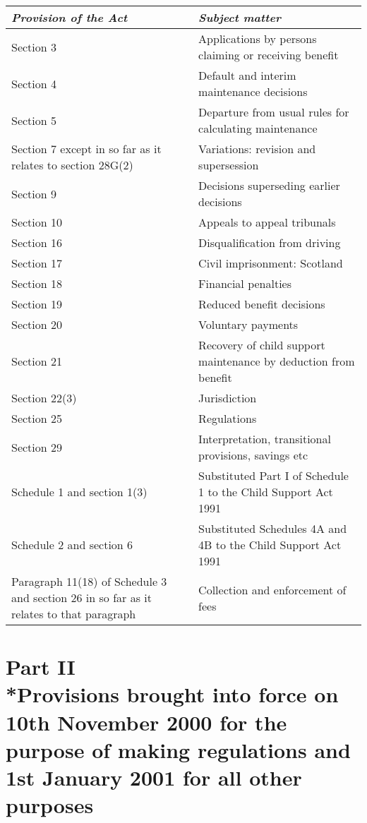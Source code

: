 \documentclass[12pt,a4paper]{article}
\begin{document}
{\footnotesize\noindent
\begin{tabulary}{\linewidth}{JJ}
\hline
\itshape Provision of the Act	& \itshape Subject matter\\
\hline
Section 3	&Applications by persons claiming or receiving benefit\\
Section 4&	Default and interim maintenance decisions\\
Section 5&	Departure from usual rules for calculating maintenance\\
Section 7 except in so far as it relates to section 28G(2)	&Variations: revision and supersession\\
Section 9	&Decisions superseding earlier decisions\\
Section 10	&Appeals to appeal tribunals\\
Section 16	&Disqualification from driving\\
Section 17	&Civil imprisonment: Scotland\\
Section 18	&Financial penalties\\
Section 19	&Reduced benefit decisions\\
Section 20	&Voluntary payments\\
Section 21	&Recovery of child support maintenance by deduction from benefit\\
Section 22(3)	&Jurisdiction\\
Section 25	&Regulations\\
Section 29	&Interpretation, transitional provisions, savings etc\\
Schedule 1 and section 1(3)	&Substituted Part I of Schedule 1 to the Child Support Act 1991\\
Schedule 2 and section 6	&Substituted Schedules 4A and 4B to the Child Support Act 1991\\
Paragraph 11(18) of Schedule 3 and section 26 in so far as it relates to that paragraph	&Collection and enforcement of fees\\
\hline
\end{tabulary}

}

\section[Part II --- Provisions brought into force on 10th November 2000 for the purpose of making regulations and 1st January 2001 for all other purposes]{Part II\\*Provisions brought into force on 10th November 2000 for the purpose of making regulations and 1st January 2001 for all other purposes}
\end{document}
